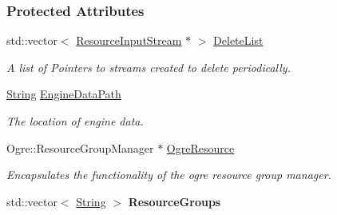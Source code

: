 \subsubsection*{Protected Attributes}
\begin{DoxyCompactItemize}
\item 
\hypertarget{classMezzanine_1_1ResourceManager_ab0aedd87abe53f208c21628fbc624bb0}{
std::vector$<$ \hyperlink{classMezzanine_1_1ResourceInputStream}{ResourceInputStream} $\ast$ $>$ \hyperlink{classMezzanine_1_1ResourceManager_ab0aedd87abe53f208c21628fbc624bb0}{DeleteList}}
\label{classMezzanine_1_1ResourceManager_ab0aedd87abe53f208c21628fbc624bb0}

\begin{DoxyCompactList}\small\item\em A list of Pointers to streams created to delete periodically. \item\end{DoxyCompactList}\item 
\hypertarget{classMezzanine_1_1ResourceManager_ab65d04f5df723eabb968365eb0a3b659}{
\hyperlink{namespaceMezzanine_acf9fcc130e6ebf08e3d8491aebcf1c86}{String} \hyperlink{classMezzanine_1_1ResourceManager_ab65d04f5df723eabb968365eb0a3b659}{EngineDataPath}}
\label{classMezzanine_1_1ResourceManager_ab65d04f5df723eabb968365eb0a3b659}

\begin{DoxyCompactList}\small\item\em The location of engine data. \item\end{DoxyCompactList}\item 
\hypertarget{classMezzanine_1_1ResourceManager_a3c1b8d26ef1e623a8f96ff5e0559a829}{
Ogre::ResourceGroupManager $\ast$ \hyperlink{classMezzanine_1_1ResourceManager_a3c1b8d26ef1e623a8f96ff5e0559a829}{OgreResource}}
\label{classMezzanine_1_1ResourceManager_a3c1b8d26ef1e623a8f96ff5e0559a829}

\begin{DoxyCompactList}\small\item\em Encapsulates the functionality of the ogre resource group manager. \item\end{DoxyCompactList}\item 
\hypertarget{classMezzanine_1_1ResourceManager_a95fb64f9f391c9bf2647b6884f370bf9}{
std::vector$<$ \hyperlink{namespaceMezzanine_acf9fcc130e6ebf08e3d8491aebcf1c86}{String} $>$ {\bfseries ResourceGroups}}
\label{classMezzanine_1_1ResourceManager_a95fb64f9f391c9bf2647b6884f370bf9}

\end{DoxyCompactItemize}


